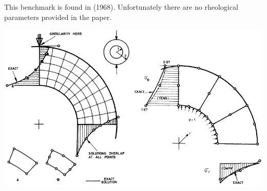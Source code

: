 
This benchmark is found in \textcite{eriz68} (1968). 
Unfortunately there are no rheological parameters provided in the paper.

\begin{center}
\includegraphics[width=14cm]{images/benchmark_ring_line_load/fig}
\end{center}


